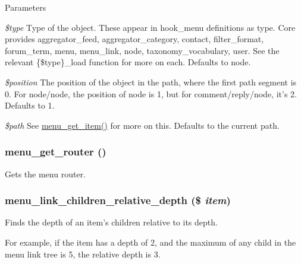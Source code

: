 \begin{DoxyParams}{Parameters}
\item[{\em \$type}]Type of the object. These appear in hook\_\-menu definitions as type. Core provides aggregator\_\-feed, aggregator\_\-category, contact, filter\_\-format, forum\_\-term, menu, menu\_\-link, node, taxonomy\_\-vocabulary, user. See the relevant \{\$type\}\_\-load function for more on each. Defaults to node. \item[{\em \$position}]The position of the object in the path, where the first path segment is 0. For node/node, the position of node is 1, but for comment/reply/node, it's 2. Defaults to 1. \item[{\em \$path}]See \hyperlink{group__menu_ga855b1ca6ef9e44eb6107a2b9d0f581df}{menu\_\-get\_\-item()} for more on this. Defaults to the current path. \end{DoxyParams}
\hypertarget{group__menu_ga7140ecddb2c59ae8acc74968eb339e67}{
\subsubsection[{menu\_\-get\_\-router}]{\setlength{\rightskip}{0pt plus 5cm}menu\_\-get\_\-router ()}}
\label{group__menu_ga7140ecddb2c59ae8acc74968eb339e67}
Gets the menu router. \hypertarget{group__menu_ga75c0660b49841423d8d3c8908e9023fc}{
\subsubsection[{menu\_\-link\_\-children\_\-relative\_\-depth}]{\setlength{\rightskip}{0pt plus 5cm}menu\_\-link\_\-children\_\-relative\_\-depth (\$ {\em item})}}
\label{group__menu_ga75c0660b49841423d8d3c8908e9023fc}
Finds the depth of an item's children relative to its depth.

For example, if the item has a depth of 2, and the maximum of any child in the menu link tree is 5, the relative depth is 3.


